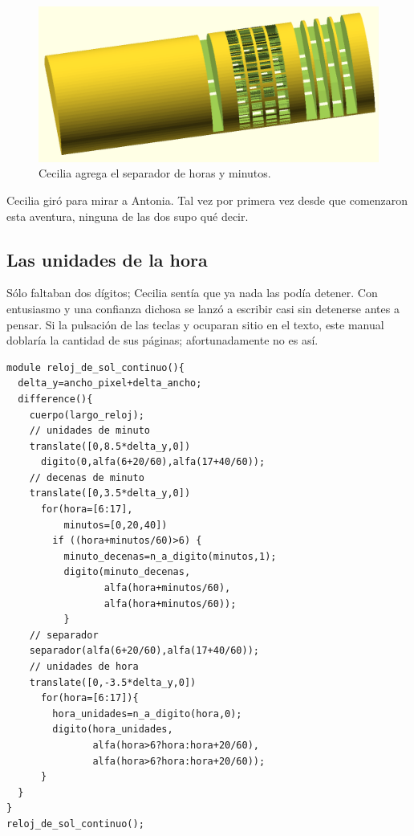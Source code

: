 \begin{figure}[ht]
  \centering
  \includegraphics[width=.85\textwidth]{imagenes/separador-continuo}  
  \caption{Cecilia agrega el separador de horas y minutos.}
  \label{fig:separador-continuo}
\end{figure}


Cecilia giró para mirar a Antonia. Tal vez por primera vez desde que
comenzaron esta aventura, ninguna de las dos supo qué decir.

\subsection{Las unidades de la hora}

Sólo faltaban dos dígitos; Cecilia sentía que ya nada las podía
detener. Con entusiasmo y una confianza dichosa se lanzó a escribir
casi sin detenerse antes a pensar. Si la pulsación de las teclas
 y \keystroke{$\Longleftarrow$} ocuparan sitio en el
texto, este manual doblaría la cantidad de sus páginas; afortunadamente
no es así.

\begin{lstlisting}
module reloj_de_sol_continuo(){
  delta_y=ancho_pixel+delta_ancho;
  difference(){
    cuerpo(largo_reloj);    
    // unidades de minuto
    translate([0,8.5*delta_y,0])
      digito(0,alfa(6+20/60),alfa(17+40/60));  
    // decenas de minuto
    translate([0,3.5*delta_y,0])
      for(hora=[6:17],
          minutos=[0,20,40])
        if ((hora+minutos/60)>6) {
          minuto_decenas=n_a_digito(minutos,1);
          digito(minuto_decenas,
                 alfa(hora+minutos/60),
                 alfa(hora+minutos/60));
          }
    // separador
    separador(alfa(6+20/60),alfa(17+40/60));  
    // unidades de hora
    translate([0,-3.5*delta_y,0])
      for(hora=[6:17]){
        hora_unidades=n_a_digito(hora,0);
        digito(hora_unidades,
               alfa(hora>6?hora:hora+20/60),
               alfa(hora>6?hora:hora+20/60));
      }
  }  
}
reloj_de_sol_continuo();
\end{lstlisting}%


